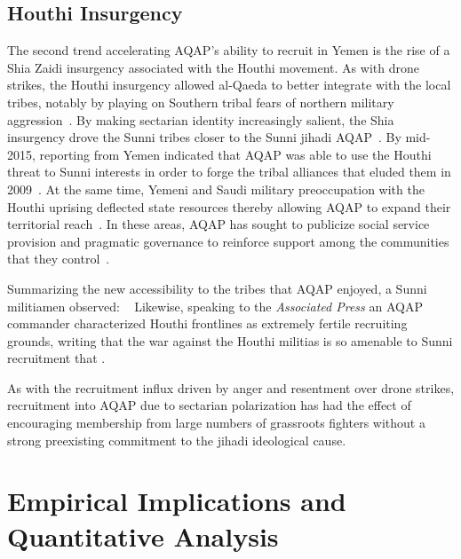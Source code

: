 \subsection{Houthi Insurgency}
The second trend accelerating AQAP's ability to recruit in Yemen is the rise of a Shia Zaidi insurgency associated with the Houthi movement. As with drone strikes, the Houthi insurgency allowed al-Qaeda to better integrate with the local tribes, notably by playing on Southern tribal fears of northern military aggression~\autocite{kendall2018contemporary}. By making sectarian
identity increasingly salient, the Shia insurgency drove the Sunni
tribes closer to the Sunni jihadi AQAP~\autocite{campbell2015tribal,
  worth2015nyrb,  hubbard2015yemen}. By mid-2015, reporting from Yemen
indicated that AQAP was able to use the Houthi threat to Sunni
interests in order to forge the tribal alliances that eluded them in
2009~\parencite{hubbard2015yemen, batati2015yemen}.
At the same time, Yemeni and Saudi military preoccupation
with the Houthi uprising deflected state resources thereby allowing
AQAP to expand their territorial reach~\autocite{reuters2016richer}. In
these areas, AQAP has sought to publicize social service provision and
pragmatic governance to reinforce support among the communities that
they control~\autocite{reuters2016richer}.

Summarizing the new accessibility to the tribes that AQAP enjoyed, a Sunni militiamen
observed: ~\autocite{worth2015nyrb} Likewise, speaking to the \textit{Associated Press} an AQAP commander characterized Houthi frontlines as extremely fertile recruiting grounds, writing that the war against the Houthi militias is so amenable to Sunni recruitment that \autocite{michael2018yemen}.

As with the recruitment influx driven by anger and resentment over drone strikes, recruitment into AQAP due to sectarian polarization has had the effect of encouraging membership from large numbers of grassroots fighters without a strong preexisting commitment to the jihadi ideological cause.


\section{Empirical Implications and Quantitative Analysis}
\label{sec:empirical-implications}

